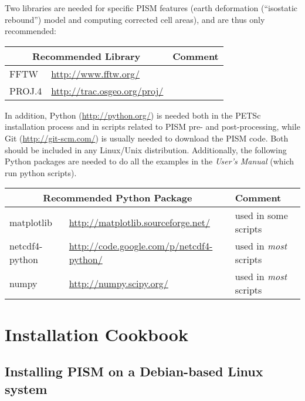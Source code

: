 \documentclass[titlepage,letterpaper,final]{scrartcl}
\begin{document}
Two libraries are needed for specific PISM features (earth deformation (``isostatic rebound'') 
model and computing corrected cell areas), and are thus only recommended: \bigskip

\begin{center}
  \begin{tabular}{lll}
    \toprule
    \multicolumn{2}{c}{\textbf{Recommended Library}} & \textbf{Comment}\\
    \midrule
    FFTW & \url{http://www.fftw.org/} & \\
    PROJ.4 & \url{http://trac.osgeo.org/proj/} & \\
   \bottomrule
  \end{tabular}
\end{center}

\bigskip

In addition, Python (\url{http://python.org/}) is needed both in the PETSc installation process and in scripts related to PISM pre- and post-processing, while Git (\url{http://git-scm.com/}) is usually needed to download the PISM code.  Both should be included in any Linux/Unix distribution.  Additionally, the following Python packages are needed to do all the examples in the \emph{User's Manual} (which run python scripts).
\bigskip

\begin{center}
  \begin{tabular}{lll}
    \toprule
    \multicolumn{2}{c}{\textbf{Recommended Python Package}} & \textbf{Comment}\\
    \midrule
    matplotlib & \url{http://matplotlib.sourceforge.net/} & used in some scripts \\
    netcdf4-python & \url{http://code.google.com/p/netcdf4-python/} & used in \emph{most} scripts \\
    numpy & \url{http://numpy.scipy.org/} & used in \emph{most} scripts \\
   \bottomrule
  \end{tabular}
\end{center}

\section{Installation Cookbook}\label{sec:cookbook}

\subsection{Installing PISM on a Debian-based Linux system} \label{subsec:debian}
\end{document}
